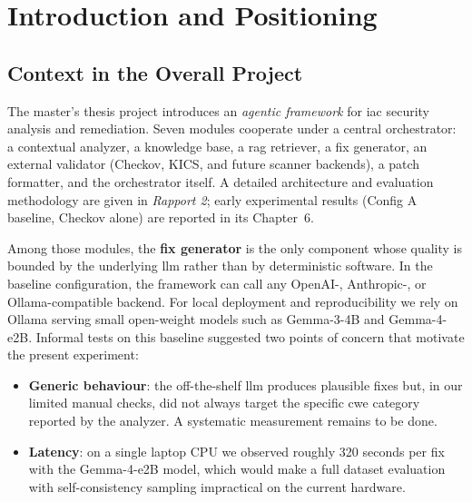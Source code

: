 \documentclass[12pt, a4paper]{report}
\begin{document}
\tableofcontents
\listoffigures
\listoftables

\printglossary[type=\acronymtype, title=List of Acronyms]

\chapter{Introduction and Positioning}

\section{Context in the Overall Project}

The master's thesis project introduces an \emph{agentic framework} for
\gls{iac} security analysis and remediation. Seven modules cooperate under
a central orchestrator: a contextual analyzer, a knowledge base, a
\gls{rag} retriever, a fix generator, an external validator (Checkov,
KICS, and future scanner backends), a patch formatter, and the orchestrator itself. A
detailed architecture and evaluation methodology are given in
\emph{Rapport 2}; early experimental results (Config A baseline, Checkov
alone) are reported in its Chapter~6.

Among those modules, the \textbf{fix generator} is the only component whose
quality is bounded by the underlying \gls{llm} rather than by deterministic
software. In the baseline configuration, the framework can call any
OpenAI-, Anthropic-, or Ollama-compatible backend. For local deployment and
reproducibility we rely on Ollama serving small open-weight models such as
Gemma-3-4B and Gemma-4-e2B. Informal tests on this baseline suggested two
points of concern that motivate the present experiment:

\begin{itemize}
  \item \textbf{Generic behaviour}: the off-the-shelf \gls{llm} produces
  plausible fixes but, in our limited manual checks, did not always target
  the specific \gls{cwe} category reported by the analyzer. A systematic
  measurement remains to be done.
  \item \textbf{Latency}: on a single laptop CPU we observed roughly 320
  seconds per fix with the Gemma-4-e2B model, which would make a full
  dataset evaluation with self-consistency sampling impractical on the
  current hardware.
\end{itemize}
\end{document}
